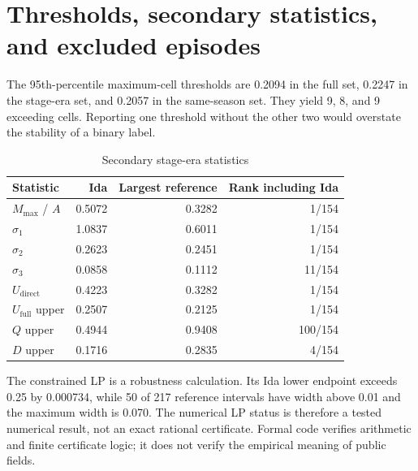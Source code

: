 \documentclass[11pt]{article}
\begin{document}
\section{Thresholds, secondary statistics, and excluded episodes}

The 95th-percentile maximum-cell thresholds are 0.2094 in the full set, 0.2247 in the stage-era set, and 0.2057 in the same-season set. They yield 9, 8, and 9 exceeding cells. Reporting one threshold without the other two would overstate the stability of a binary label.

\begin{table}[t]
\centering
\caption{Secondary stage-era statistics}
\label{tab:secondarysupp}
\begin{tabular}{@{}lrrr@{}}
\toprule
Statistic & Ida & Largest reference & Rank including Ida \\
\midrule
$M_{\max}$ / $A$ & 0.5072 & 0.3282 & 1/154 \\
$\sigma_1$ & 1.0837 & 0.6011 & 1/154 \\
$\sigma_2$ & 0.2623 & 0.2451 & 1/154 \\
$\sigma_3$ & 0.0858 & 0.1112 & 11/154 \\
$U_{\mathrm{direct}}$ & 0.4223 & 0.3282 & 1/154 \\
$U_{\mathrm{full}}$ upper & 0.2507 & 0.2125 & 1/154 \\
$Q$ upper & 0.4944 & 0.9408 & 100/154 \\
$D$ upper & 0.1716 & 0.2835 & 4/154 \\
\bottomrule
\end{tabular}
\end{table}

The constrained LP is a robustness calculation. Its Ida lower endpoint exceeds 0.25 by 0.000734, while 50 of 217 reference intervals have width above 0.01 and the maximum width is 0.070. The numerical LP status is therefore a tested numerical result, not an exact rational certificate. Formal code verifies arithmetic and finite certificate logic; it does not verify the empirical meaning of public fields.
\end{document}
